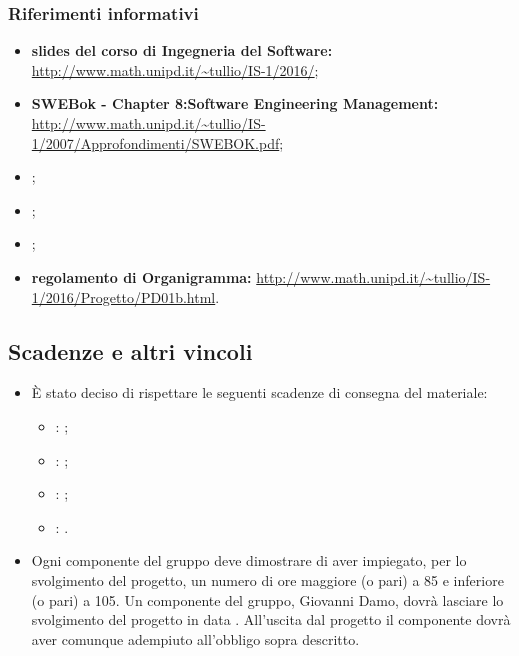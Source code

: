 		\subsubsection{Riferimenti informativi}
		\begin{itemize}
				\item \textbf{slides del corso di Ingegneria del Software:}\\
                \url{http://www.math.unipd.it/~tullio/IS-1/2016/};
                \item \textbf{SWEBok - Chapter 8:Software Engineering Management:}\\
                \url{http://www.math.unipd.it/~tullio/IS-1/2007/Approfondimenti/SWEBOK.pdf};
				\item {\sdfv};
				\item {\pdqv};
				\item {\adrv};
				\item \textbf{regolamento di Organigramma:}
				\url{http://www.math.unipd.it/~tullio/IS-1/2016/Progetto/PD01b.html}.
		\end{itemize}
	\subsection {Scadenze e altri vincoli}
	\label{subsec:scadenze}
	\begin{itemize}
	\item
		È stato deciso di rispettare le seguenti scadenze di consegna del materiale:
		\begin{itemize}
			 \item {\revereq}: ;
			 \item {\revprog}: ;
			 \item {\revaqual}: ;
			 \item {\revacc}: .
		\end{itemize}
	\item
		Ogni componente del gruppo deve dimostrare di aver impiegato, per lo svolgimento del progetto, un numero di ore maggiore (o pari) a 85 e inferiore (o pari) a 105.
		Un componente del gruppo, Giovanni Damo, dovrà lasciare lo svolgimento del progetto in data . All'uscita dal progetto il componente dovrà aver comunque adempiuto all'obbligo sopra descritto.
	\end{itemize}
